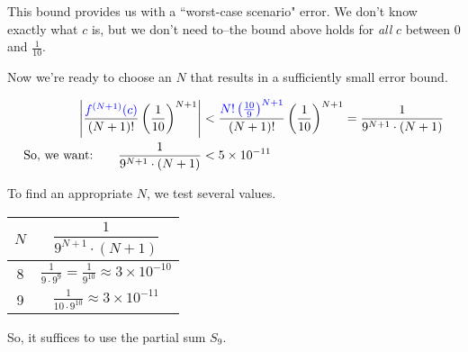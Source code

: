 \begin{solution}
This bound provides us with a ``worst-case scenario" error. We don't know exactly what $c$ is, but we don't need to--the bound above holds for \emph{all} $c$ between 0 and $\frac{1}{10}$.

Now we're ready to choose an $N$ that results in a sufficiently small error bound.

\begin{align*}
\left|\frac{\textcolor{blue}{f^{(N+1)}(c)}}{(N+1)!}\left(\frac{1}{10}\right)^{N+1}\right|&<
\frac{\textcolor{blue}{N!\left(\tfrac{10}{9}\right)^{N+1}}}{(N+1)!}\left(\frac{1}{10}\right)^{N+1}=\frac{1}{9^{N+1}\cdot (N+1)}\\
\text{So, we want:}\qquad \frac{1}{9^{N+1}\cdot (N+1)}&<5\times 10^{-11}
\end{align*}

To find an appropriate $N$, we test several values.

\begin{center}
	\begin{tabular}{|c|c|}
		\hline
		$N$&$ \dfrac{1}{9^{N+1}\cdot (N+1)}$\\ \hline
		8 & $\displaystyle \frac{1}{9\cdot 9^{9}}=\frac{1}{9^{10}}\approx 3\times 10^{-10}$\\\hline
		9 & $\displaystyle \frac{1}{10\cdot 9^{10}}\approx 3\times 10^{-11}$\\
		\hline
	\end{tabular}
\end{center}
So, it suffices to use the partial sum $S_9$.
\end{solution}



